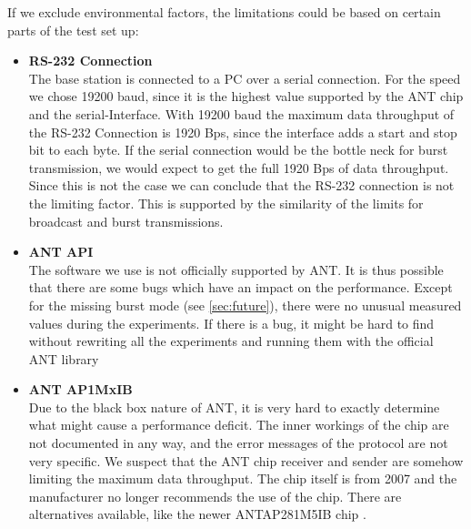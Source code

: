 If we exclude environmental factors, the limitations could be based on certain parts of the test set up:
\begin{itemize}
	\item{\textbf{RS-232 Connection}} \hfill \\ The base station is connected to a PC over a serial connection. For the speed we chose 19200 baud, since it is the highest value supported by the ANT chip and the serial-Interface. With 19200 baud the maximum data throughput of the RS-232 Connection is 1920 Bps, since the interface adds a start and stop bit to each byte. If the serial connection would be the bottle neck for burst transmission, we would expect to get the full 1920 Bps of data throughput. Since this is not the case we can conclude that the RS-232 connection is not the limiting factor. This is supported by the similarity of the limits for broadcast and burst transmissions.

	\item{\textbf{ANT API}} \hfill \\ The software we use is not officially supported by ANT. It is thus possible that there are some bugs which have an impact on the performance. Except for the missing burst mode (see \ref{sec:future}), there were no unusual measured values during the experiments. If there is a bug, it might be hard to find without rewriting all the experiments and running them with the official ANT library \cite{ANTWinLib}
	
	\item{\textbf{ANT AP1MxIB}} \hfill \\ Due to the black box nature of ANT, it is very hard to exactly determine what might cause a performance deficit. The inner workings of the chip are not documented in any way, and the error messages of the protocol are not very specific. We suspect that the ANT chip receiver and sender are somehow limiting the maximum data throughput. The chip itself is from 2007 and the manufacturer no longer recommends the use of the chip\cite{AP1page}. There are alternatives available, like the newer ANTAP281M5IB chip \cite{AP2Datasheet}.
\end{itemize}
\newpage